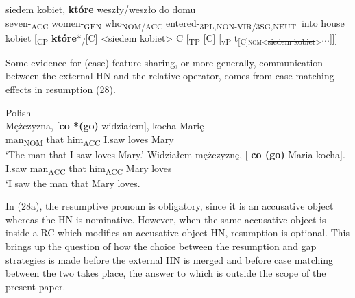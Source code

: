 \documentclass[output=paper]{langsci/langscibook}
\begin{document}

\ea%
    \label{ex:leska:27}
    \gll siedem   kobiet,   \textbf{które}     weszły/weszło       do domu\\
           seven-\textsubscript{ACC}   women-\textsubscript{GEN}   who\textsubscript{NOM/ACC}   entered-\textsubscript{3PL,NON-VIR/3SG,NEUT.} into house\\
    \glt {} kobiet [\textsubscript{CP} \textbf{które}*\textsubscript{\slash}[C] <\st{siedem kobiet}> C [\textsubscript{TP} [C] [\textsubscript{vP} t\textsubscript{[C]{\footnotesize\scshape nom}<\st{siedem kobiet}>}...]]]
\z

 
Some evidence for (case) feature sharing, or more generally, communication between the external HN and the relative operator, comes from case matching effects in resumption (28).

\ea%
    Polish\label{ex:leska:28}\\
    \ea
    \gll Mężczyzna, [\textbf{co *(go)}   widziałem],   kocha   Marię     \\
          man\textsubscript{NOM}   that him\textsubscript{ACC}   I.saw     loves   Mary\\
    \glt ‘The man that I saw loves Mary.’
    \ex
    \gll  Widziałem   mężczyznę, [  \textbf{co (go)}   Maria   kocha]. \\
          I.saw     man\textsubscript{ACC}   that him\textsubscript{ACC}   Mary   loves\\
    \glt ‘I saw the man that Mary loves.
    \z
\z

In (28a), the resumptive pronoun is obligatory, since it is an accusative object whereas the HN is nominative. However, when the same accusative object is inside a RC which modifies an accusative object HN, resumption is optional. This brings up the question of how the choice between the resumption and gap strategies is made before the external HN is merged and before case matching between the two takes place, the answer to which is outside the scope of the present paper. 
\end{document}
